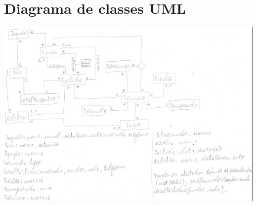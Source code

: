 \documentclass[a4paper]{article}
\begin{document}





\section{Diagrama de classes UML}

\begin{center}
  \includegraphics[scale=0.83]{BDAD_DIAGRAMA.jpeg}
\end{center}

\clearpage
{}
\renewcommand\refname{Bibliografia}


\end{document}

